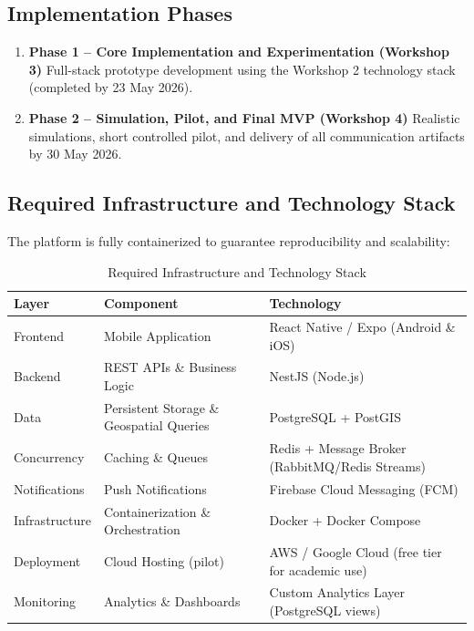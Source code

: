 \documentclass[9pt,conference]{IEEEtran}
\begin{document}
\subsection{Implementation Phases}
\begin{enumerate}
    \item \textbf{Phase 1 – Core Implementation and Experimentation (Workshop 3)}  
    Full-stack prototype development using the Workshop 2 technology stack (completed by 23 May 2026).
    \item \textbf{Phase 2 – Simulation, Pilot, and Final MVP (Workshop 4)}  
    Realistic simulations, short controlled pilot, and delivery of all communication artifacts by 30 May 2026.
\end{enumerate}

\subsection{Required Infrastructure and Technology Stack}

The platform is fully containerized to guarantee reproducibility and scalability:

\begin{table}[h]
\centering
\small
\caption{Required Infrastructure and Technology Stack}
\label{tab:infrastructure}
\begin{tabular}{@{}p{1.5cm}p{2.0cm}p{3.5cm}@{}}
\toprule
\textbf{Layer} & \textbf{Component} & \textbf{Technology} \\
\midrule
Frontend & Mobile Application & React Native / Expo (Android \& iOS) \\
Backend & REST APIs \& Business Logic & NestJS (Node.js) \\
Data & Persistent Storage \& Geospatial Queries & PostgreSQL + PostGIS \\
Concurrency & Caching \& Queues & Redis + Message Broker (RabbitMQ/Redis Streams) \\
Notifications & Push Notifications & Firebase Cloud Messaging (FCM) \\
Infrastructure & Containerization \& Orchestration & Docker + Docker Compose \\
Deployment & Cloud Hosting (pilot) & AWS / Google Cloud (free tier for academic use) \\
Monitoring & Analytics \& Dashboards & Custom Analytics Layer (PostgreSQL views) \\
\bottomrule
\end{tabular}
\end{table}
\end{document}
